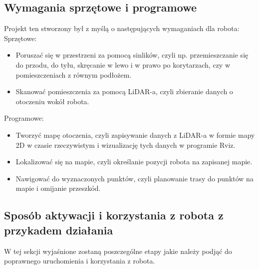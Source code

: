 \documentclass[a4paper,twoside,12pt]{book}
\begin{document}
\subsection{Wymagania sprzętowe i programowe}
Projekt ten stworzony był z myślą o następujących wymaganiach dla robota:
\newline
Sprzętowe:
\begin{itemize}
	\item Poruszać się w przestrzeni za pomocą sinlików, czyli np. przemieszczanie się do przodu, do tyłu, skręcanie w lewo i w prawo po korytarzach, czy w pomieszczeniach z równym podłożem.
	\item Skanować pomieszczenia za pomocą LiDAR-a, czyli zbieranie danych o otoczeniu wokół robota.
	\end{itemize}
Programowe:
\begin{itemize}
	\item Tworzyć mapę otoczenia, czyli zapisywanie danych z LiDAR-a w formie mapy 2D w czasie rzeczywistym i wizualizację tych danych w programie Rviz.
	\item Lokalizować się na mapie, czyli określanie pozycji robota na zapisanej mapie.
	\item Nawigować do wyznaczonych punktów, czyli planowanie trasy do punktów na mapie i omijanie przeszkód.
\end{itemize}
\newpage

\subsection{Sposób aktywacji i korzystania z robota z przykadem działania}
W tej sekcji wyjaśnione zostaną poszczególne etapy jakie należy podjąć do poprawnego uruchomienia i korzystania z robota.
\end{document}
